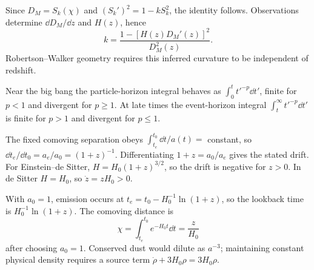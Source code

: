 \begin{solutions}
\begin{solution}
Since \(D_M=S_k(\chi)\) and
\((S_k')^2=1-kS_k^2\), the identity follows.  Observations determine
\(\dd D_M/\dd z\) and \(H(z)\), hence
\[
k=\frac{1-[H(z)D_M'(z)]^2}{D_M^2(z)}.
\]
Robertson--Walker geometry requires this inferred curvature to be independent
of redshift.
\end{solution}

\begin{solution}
Near the big bang the particle-horizon integral behaves as
\(\int_0^t t'^{-p}\dd t'\), finite for \(p<1\) and divergent for
\(p\geq1\).  At late times the event-horizon integral
\(\int_t^\infty t'^{-p}\dd t'\) is finite for \(p>1\) and divergent for
\(p\leq1\).
\end{solution}

\begin{solution}
The fixed comoving separation obeys
\(\int_{t_e}^{t_0}\dd t/a(t)=\) constant, so
\(\dd t_e/\dd t_0=a_e/a_0=(1+z)^{-1}\).  Differentiating
\(1+z=a_0/a_e\) gives the stated drift.  For Einstein--de Sitter,
\(H=H_0(1+z)^{3/2}\), so the drift is negative for \(z>0\).  In de Sitter
\(H=H_0\), so \(\dot z=zH_0>0\).
\end{solution}

\begin{solution}
With \(a_0=1\), emission occurs at
\(t_e=t_0-H_0^{-1}\ln(1+z)\), so the lookback time is
\(H_0^{-1}\ln(1+z)\).  The comoving distance is
\[
\chi=\int_{t_e}^{t_0}e^{-H_0t}\dd t
=\frac{z}{H_0}
\]
after choosing \(a_0=1\).  Conserved dust would dilute as \(a^{-3}\);
maintaining constant physical density requires a source term
\(\dot\rho+3H_0\rho=3H_0\rho\).
\end{solution}



\end{solutions}
